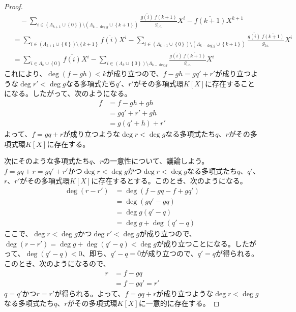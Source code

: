 \documentclass[dvipdfmx]{jsarticle}
\begin{document}
\begin{proof}
\begin{align*}
&\quad - \sum_{i \in \left( \varLambda_{k + 1} \cup \left\{ 0 \right\} \right) \setminus \left( \varLambda_{k - \deg g} \cup \left\{ k + 1 \right\} \right)} {\frac{\overline{g(i)}\ \overline{f(k + 1)}}{{g}_{\mathrm{l.c.}}}X^{i}} - \overline{f(k + 1)}X^{k + 1}\\
&= \sum_{i \in \left( \varLambda_{k + 1} \cup \left\{ 0 \right\} \right) \setminus \left\{ k + 1 \right\}} {\overline{f(i)}X^{i}} - \sum_{i \in \left( \varLambda_{k + 1} \cup \left\{ 0 \right\} \right) \setminus \left( \varLambda_{k - \deg g} \cup \left\{ k + 1 \right\} \right)} {\frac{\overline{g(i)}\ \overline{f(k + 1)}}{{g}_{\mathrm{l.c.}}}X^{i}}\\
&= \sum_{i \in \varLambda_{k} \cup \left\{ 0 \right\}} {\overline{f(i)}X^{i}} - \sum_{i \in \left( \varLambda_{k} \cup \left\{ 0 \right\} \right) \setminus \varLambda_{k - \deg g}} {\frac{\overline{g(i)}\ \overline{f(k + 1)}}{{g}_{\mathrm{l.c.}}}X^{i}}
\end{align*}
これにより、$\deg(f - gh) < k$が成り立つので、$f - gh = gq' + r'$が成り立つような$\deg r' < \deg g$なる多項式たち$q'$、$r'$がその多項式環$K[ X]$に存在することになる。したがって、次のようになる。
\begin{align*}
f &= f - gh + gh\\
&= gq' + r' + gh\\
&= g\left( q' + h \right) + r'
\end{align*}
よって、$f = gq + r$が成り立つような$\deg r < \deg g$なる多項式たち$q$、$r$がその多項式環$K[ X]$に存在する。\par
次にそのような多項式たち$q$、$r$の一意性について、議論しよう。$f = gq + r = gq' + r'$かつ$\deg r < \deg g$かつ$\deg r < \deg g$なる多項式たち$q$、$q'$、$r$、$r'$がその多項式環$K[ X]$に存在するとする。このとき、次のようになる。
\begin{align*}
\deg\left( r - r' \right) &= \deg\left( f - gq - f + gq' \right)\\
&= \deg\left( gq' - gq \right)\\
&= \deg{g\left( q' - q \right)}\\
&= \deg g + \deg\left( q' - q \right)
\end{align*}
ここで、$\deg r < \deg g$かつ$\deg r' < \deg g$が成り立つので、$\deg\left( r - r' \right) = \deg g + \deg\left( q' - q \right) < \deg g$が成り立つことになる。したがって、$\deg\left( q' - q \right) < 0$、即ち、$q' - q = \overline{0}$が成り立つので、$q' = q$が得られる。このとき、次のようになるので、
\begin{align*}
r &= f - gq\\
&= f - gq' = r'
\end{align*}
$q = q'$かつ$r = r'$が得られる。よって、$f = gq + r$が成り立つような$\deg r < \deg g$なる多項式たち$q$、$r$がその多項式環$K[ X]$に一意的に存在する。
\end{proof}
\end{document}
